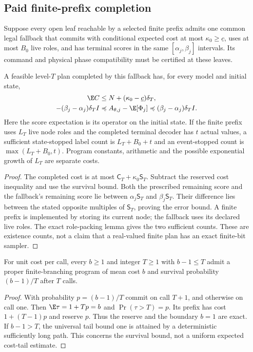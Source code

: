 \subsection{Paid finite-prefix completion}
Suppose every open leaf reachable by a selected finite prefix admits one common legal fallback that commits with conditional expected cost at most $\kappa_0\ge\underline c$, uses at most $B_0$ live roles, and has terminal scores in the same $[\alpha_j,\beta_j]$ intervals. Its command and physical phase compatibility must be certified at these leaves.

\begin{corollary}\label{cor:synthesis-fallback}
A feasible level-$T$ plan completed by this fallback has, for every model and initial state,
\begin{align}
 \E C&\le N+(\kappa_0-\underline c)\delta_T,\label{eq:fallback-budget}\\
 - (\beta_j-\alpha_j)\delta_T I
 &\preccurlyeq A_{\theta,j}-\E[\Phi_j]\preccurlyeq
       (\beta_j-\alpha_j)\delta_T I.\label{eq:fallback-error}
\end{align}
Here the score expectation is its operator on the initial state. If the finite prefix uses $L_T$ live node roles and the completed terminal decoder has $t$ actual values, a sufficient state-stopped label count is $L_T+B_0+t$ and an event-stopped count is $\max(L_T+B_0,t)$. Program constants, arithmetic and the possible exponential growth of $L_T$ are separate costs.
\end{corollary}
\begin{proof}
The completed cost is at most $\mathsf C_T+\kappa_0\mathsf S_T$. Subtract the reserved cost inequality and use the survival bound. Both the prescribed remaining score and the fallback's remaining score lie between $\alpha_j\mathsf S_T$ and $\beta_j\mathsf S_T$. Their difference lies between the stated opposite multiples of $\mathsf S_T$, proving the error bound. A finite prefix is implemented by storing its current node; the fallback uses its declared live roles. The exact role-packing lemma gives the two sufficient counts. These are existence counts, not a claim that a real-valued finite plan has an exact finite-bit sampler.
\end{proof}

\begin{proposition}\label{prop:tail-sharp}
For unit cost per call, every $b\ge1$ and integer $T\ge1$ with $b-1\le T$ admit a proper finite-branching program of mean cost $b$ and survival probability $(b-1)/T$ after $T$ calls.
\end{proposition}
\begin{proof}
With probability $p=(b-1)/T$ commit on call $T+1$, and otherwise on call one. Then $\E\tau=1+Tp=b$ and $\Pr(\tau>T)=p$. Its prefix has cost $1+(T-1)p$ and reserve $p$. Thus the reserve and the boundary $b=1$ are exact. If $b-1>T$, the universal tail bound one is attained by a deterministic sufficiently long path. This concerns the survival bound, not a uniform expected cost-tail estimate.
\end{proof}

